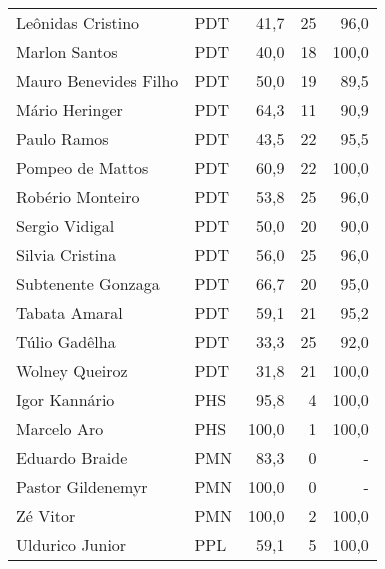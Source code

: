 \begin{longtable}{llrrr}
                   Leônidas Cristino &            PDT &      41,7 &           25 &       96,0 \\
                       Marlon Santos &            PDT &      40,0 &           18 &      100,0 \\
               Mauro Benevides Filho &            PDT &      50,0 &           19 &       89,5 \\
                      Mário Heringer &            PDT &      64,3 &           11 &       90,9 \\
                         Paulo Ramos &            PDT &      43,5 &           22 &       95,5 \\
                    Pompeo de Mattos &            PDT &      60,9 &           22 &      100,0 \\
                    Robério Monteiro &            PDT &      53,8 &           25 &       96,0 \\
                      Sergio Vidigal &            PDT &      50,0 &           20 &       90,0 \\
                     Silvia Cristina &            PDT &      56,0 &           25 &       96,0 \\
                  Subtenente Gonzaga &            PDT &      66,7 &           20 &       95,0 \\
                       Tabata Amaral &            PDT &      59,1 &           21 &       95,2 \\
                       Túlio Gadêlha &            PDT &      33,3 &           25 &       92,0 \\
                      Wolney Queiroz &            PDT &      31,8 &           21 &      100,0 \\
                       Igor Kannário &            PHS &      95,8 &            4 &      100,0 \\
                         Marcelo Aro &            PHS &     100,0 &            1 &      100,0 \\
                      Eduardo Braide &            PMN &      83,3 &            0 &          - \\
                   Pastor Gildenemyr &            PMN &     100,0 &            0 &          - \\
                            Zé Vitor &            PMN &     100,0 &            2 &      100,0 \\
                     Uldurico Junior &            PPL &      59,1 &            5 &      100,0 \\

\end{longtable}
